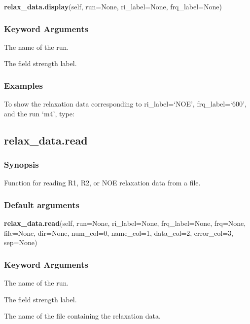 \textsf{\textbf{relax\_data.display}(self, run=None, ri\_label=None, frq\_label=None)}


\subsubsection{Keyword Arguments}

  The name of the run.

  The field strength label.

\subsubsection{Examples}

To show the relaxation data corresponding to ri\_label=`NOE', frq\_label=`600', and the run
`m4', type:




\newpage

\subsection{relax\_data.read}


\subsubsection{Synopsis}

Function for reading R1, R2, or NOE relaxation data from a file.

\subsubsection{Default arguments}

\textsf{\textbf{relax\_data.read}(self, run=None, ri\_label=None, frq\_label=None, frq=None, file=None, dir=None, num\_col=0, name\_col=1, data\_col=2, error\_col=3, sep=None)}


\subsubsection{Keyword Arguments}

  The name of the run.

  The field strength label.

  The name of the file containing the relaxation data.

